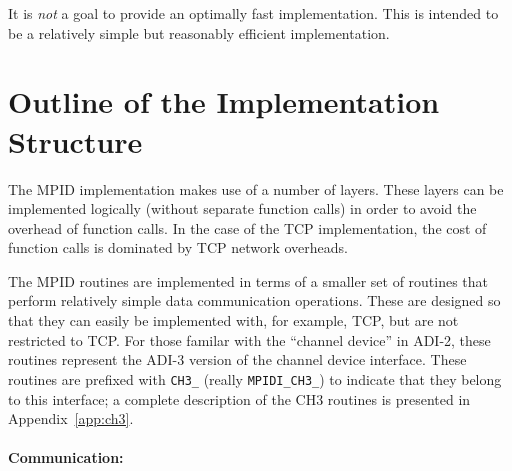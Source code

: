 \documentclass{article}
\def\code{\begingroup\makeustext\eatcode}
\def\eatcode#1{\texttt{#1}\endgroup}
\begin{document}
It is \emph{not} a goal to provide an optimally fast implementation. This is
intended to be a relatively simple but reasonably efficient implementation.


\section{Outline of the Implementation Structure}
\label{sec:impl-outline}

The MPID implementation makes use of a number of layers.  These layers
can be implemented logically (without separate function calls) in
order to avoid the overhead of function calls.  In the case of the TCP
implementation, the cost of function calls is dominated by TCP network
overheads.  


The MPID routines are implemented in terms of a smaller set of routines that
perform relatively simple data communication operations.  These are designed
so that they can easily be implemented with, for example, TCP, but are not
restricted to TCP.  For those familar with the ``channel device'' in ADI-2,
these routines represent the ADI-3 version of the channel device interface.
These routines are prefixed with \code{CH3_} (really \code{MPIDI_CH3_}) to
indicate that they belong to 
this interface; a complete description of the CH3 routines is presented in
Appendix~\ref{app:ch3}. 

\paragraph{Communication:}
\end{document}
